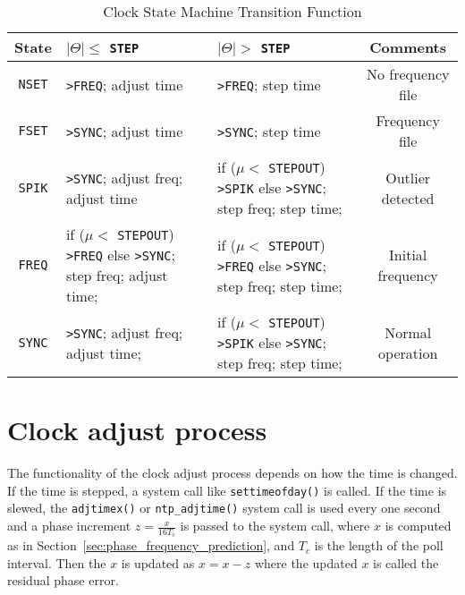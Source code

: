 \begin{table}[ht]
    \centering
    \caption{Clock State Machine Transition Function}
    \label{tab:clock_state_machine_transition_function}
    \begin{tabular}{|c|p{43mm}|p{43mm}|c|}
        \hline
        State &\hfil $|\Theta|\le$ \verb|STEP| & \hfil $|\Theta|>$ \verb|STEP| 
        & Comments \\
        \hline
        \verb|NSET| & \verb|>FREQ|; adjust time & \verb|>FREQ|; step time 
            & No frequency file \\
        \hline
        \verb|FSET| & \verb|>SYNC|; adjust time & \verb|>SYNC|; step time
            & Frequency file \\
        \hline
        \verb|SPIK| & \verb|>SYNC|; adjust freq; adjust time 
        & if ($\mu <$ \verb|STEPOUT|) \verb|>SPIK| \newline 
        else \verb|>SYNC|; step freq; step time;
        & Outlier detected \\
        \hline
        \verb|FREQ| & if ($\mu <$ \verb|STEPOUT|) \verb|>FREQ| \newline 
        else \verb|>SYNC|; step freq; adjust time;
        & if ($\mu <$ \verb|STEPOUT|) \verb|>FREQ| \newline 
        else \verb|>SYNC|; step freq; step time;
        & Initial frequency \\
        \hline
        \verb|SYNC| & \verb|>SYNC|; adjust freq; adjust time;
        & if ($\mu <$ \verb|STEPOUT|) \verb|>SPIK| \newline 
        else \verb|>SYNC|; step freq; step time; & Normal operation \\
        \hline
    \end{tabular}
\end{table}

\section{Clock adjust process}%
\label{sec:clock_adjust_process}
The functionality of the clock adjust process depends on how the time is changed.
If the time is stepped, a system call like \verb|settimeofday()| is called. If
the time is slewed, the \verb|adjtimex()| or \verb|ntp_adjtime()| system call is
used every one second and a phase increment $z=\frac{x}{16T_c}$ is passed to
the system call, where $x$ is computed as in
Section~\ref{sec:phase_frequency_prediction}, and $T_c$ is the length of the 
poll interval.  Then the $x$ is updated as $x=x-z$ where the updated $x$ is
called the residual phase error.

